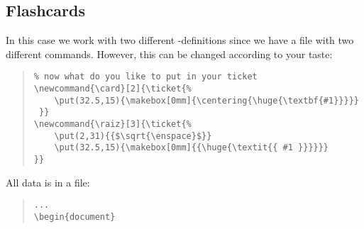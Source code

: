 \documentclass[a4paper,KOMA,landscape]{powersem}
\newcommand{\ticket}{{\code{ticket.sty}}}
\newcommand{\bs}{{\mtt\\}}
\begin{document}
\begin{slide}\vspace*{-4mm}
\subsection{Flashcards}
In this case we work with two different \code{\bs{}ticket}-definitions since we have a file
with two different commands. However, this can be changed according to your taste:
\begin{quote}
    \begin{minipage}[t]{0.5\textwidth}
      {\scriptsize
\begin{verbatim}
% now what do you like to put in your ticket
\newcommand{\card}[2]{\ticket{%
    \put(32.5,15){\makebox[0mm]{\centering{\huge{\textbf{#1}}}}}
 }}
\newcommand{\raiz}[3]{\ticket{%
    \put(2,31){{$\sqrt{\enspace}$}}
    \put(32.5,15){\makebox[0mm]{{\huge{\textit{{ #1 }}}}}}
}}
\end{verbatim}
        }
    \end{minipage}
\end{quote}

All data is in a file:
\begin{quote}
    \begin{minipage}[t]{0.5\textwidth}
      {\scriptsize
\begin{verbatim}
...
\begin{document}

\end{verbatim}
        }
    \end{minipage}
\end{quote}
\end{slide}
\end{document}
